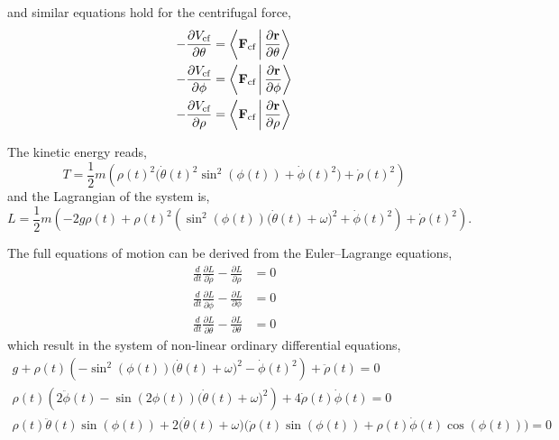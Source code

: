 \documentclass[12pt]{article}
\begin{document}
and similar equations hold for the centrifugal force,
\begin{align}
  -\frac{\partial V_\text{cf}}{\partial\theta}
    &= \left\langle\vb{F}_\text{cf}\,\middle|\,\frac{\partial\vb{r}}{\partial\theta}\right\rangle \\
  -\frac{\partial V_\text{cf}}{\partial\phi}
    &= \left\langle\vb{F}_\text{cf}\,\middle|\,\frac{\partial\vb{r}}{\partial\phi}\right\rangle \\
  -\frac{\partial V_\text{cf}}{\partial\rho}
    &= \left\langle\vb{F}_\text{cf}\,\middle|\,\frac{\partial\vb{r}}{\partial\rho}\right\rangle
\end{align}

The kinetic energy reads,
\begin{equation}
  T = \frac{1}{2}m\left(\rho(t)^2\bigl(\dot\theta(t)^2\sin^2(\phi(t)) + \dot\phi(t)^2\bigr)
    + \dot\rho(t)^2\right)
\end{equation}
and the Lagrangian of the system is,
\begin{equation}
  L = \frac{1}{2}m\left(-2g\rho(t) + \rho(t)^2\left(\sin^2(\phi(t))\bigl(\dot\theta(t)+\omega\bigr)^2
    + \dot\phi(t)^2\right) + \dot\rho(t)^2\right).
\end{equation}

The full equations of motion can be derived from the Euler--Lagrange equations,
\begin{align}
  \frac{d}{dt}\frac{\partial L}{\partial\dot\rho} - \frac{\partial L}{\partial\rho} &= 0 \\
  \frac{d}{dt}\frac{\partial L}{\partial\dot\phi} - \frac{\partial L}{\partial\phi} &= 0 \\
  \frac{d}{dt}\frac{\partial L}{\partial\dot\theta} - \frac{\partial L}{\partial\theta} &= 0
\end{align}
which result in the system of non-linear ordinary differential equations,
\begin{equation}
  \begin{gathered}
    g + \rho(t)\left(-\sin^2(\phi(t))\bigl(\dot\theta(t)+\omega\bigr)^2 - \dot\phi(t)^2\right)
      + \ddot\rho(t) = 0 \\
    \rho(t)\left(2\ddot\phi(t) - \sin(2\phi(t))\bigl(\dot\theta(t)+\omega\bigr)^2\right)
      + 4\dot\rho(t)\dot\phi(t) = 0 \\
    \rho(t)\ddot\theta(t)\sin(\phi(t))
      + 2\bigl(\dot\theta(t)+\omega\bigr)\bigl(\dot\rho(t)\sin(\phi(t))
        + \rho(t)\dot\phi(t)\cos(\phi(t))\bigr) = 0
  \end{gathered}
  \label{eq:full_eom_polar}
\end{equation}
\end{document}
